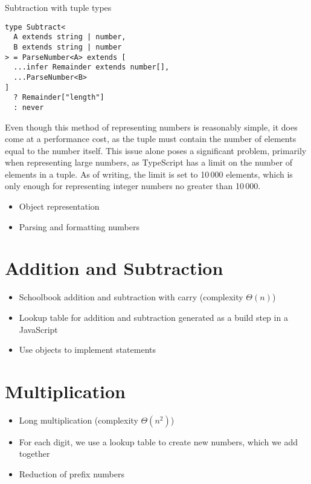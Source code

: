 \begin{listing}[ht]
\caption{Subtraction with tuple types}\label{lst:tuple-subtraction}
\begin{verbatim}
type Subtract<
  A extends string | number,
  B extends string | number
> = ParseNumber<A> extends [
  ...infer Remainder extends number[],
  ...ParseNumber<B>
]
  ? Remainder["length"]
  : never
\end{verbatim}
\end{listing}

Even though this method of representing numbers is reasonably simple, it does come at a performance cost, as the tuple must contain the number of elements equal to the number itself. This issue alone poses a significant problem, primarily when representing large numbers, as TypeScript has a limit on the number of elements in a tuple. As of writing, the limit is set to 10\,000 elements\cite{ImplementationCheckerTs2023}, which is only enough for representing integer numbers no greater than 10\,000. 

\begin{itemize}
  \item Object representation
  \item Parsing and formatting numbers
\end{itemize}

\section{Addition and Subtraction}

\begin{itemize}
  \item Schoolbook addition and subtraction with carry (complexity $\Theta(n)$)
  \item Lookup table for addition and subtraction generated as a build step in a JavaScript
  \item Use objects to implement  statements
\end{itemize}

\section{Multiplication}

\begin{itemize}
  \item Long multiplication (complexity $\Theta(n^2)$)
  \item For each digit, we use a lookup table to create new numbers, which we add together
  \item Reduction of prefix numbers
\end{itemize}

